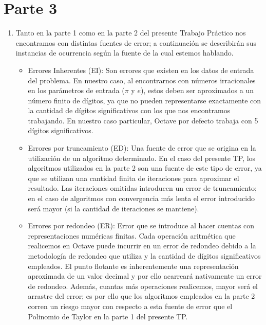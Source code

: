 \documentclass[titlepage,a4paper]{article}
\begin{document}
\section{Parte 3}\label{sec:parte3}
	\begin{enumerate}[label=(\alph*)]
		
		\item
			Tanto en la parte 1 como en la parte 2 del presente Trabajo Práctico nos encontramos con distintas fuentes de error; a continuación 
			se describirán sus instancias de ocurrencia según la fuente de la cual estemos hablando.

			\begin{itemize}
				\item Errores Inherentes (EI): Son errores que existen en los datos de entrada del problema. En nuestro caso, al encontrarnos 
				con números irracionales en los parámetros de entrada ($\pi$ y $ e $), estos deben ser aproximados a un número finito de dígitos, 
				ya que no pueden representarse exactamente con la cantidad de dígitos significativos con los que nos encontramos trabajando. 
				En nuestro caso particular, Octave por defecto trabaja con 5 dígitos significativos.
				\item Errores por truncamiento (ED): Una fuente de error que se origina en la utilización de un algoritmo determinado. En el 
				caso del presente TP, los algoritmos utilizados en la parte 2 son una fuente de este tipo de error, ya que se utilizan una 
				cantidad finita de iteraciones para aproximar el resultado. Las iteraciones omitidas introducen un error de truncamiento; 
				en el caso de algoritmos con convergencia más lenta el error introducido será mayor (si la cantidad de iteraciones se mantiene).
				\item Errores por redondeo (ER): Error que se introduce al hacer cuentas con representaciones numéricas finitas. Cada operación 
				aritmética que realicemos en Octave puede incurrir en un error de redondeo debido a la metodología de redondeo que utiliza y la 
				cantidad de dígitos significativos empleados. El punto flotante es inherentemente una representación aproximada de un valor 
				decimal y por ello acarreará nativamente un error de redondeo. Además, cuantas más operaciones realicemos, mayor será el 
				arrastre del error; es por ello que los algoritmos empleados en la parte 2 corren un riesgo mayor con respecto a esta fuente de 
				error que el Polinomio de Taylor en la parte 1 del presente TP.
			\end{itemize}


\end{enumerate}
\end{document}
